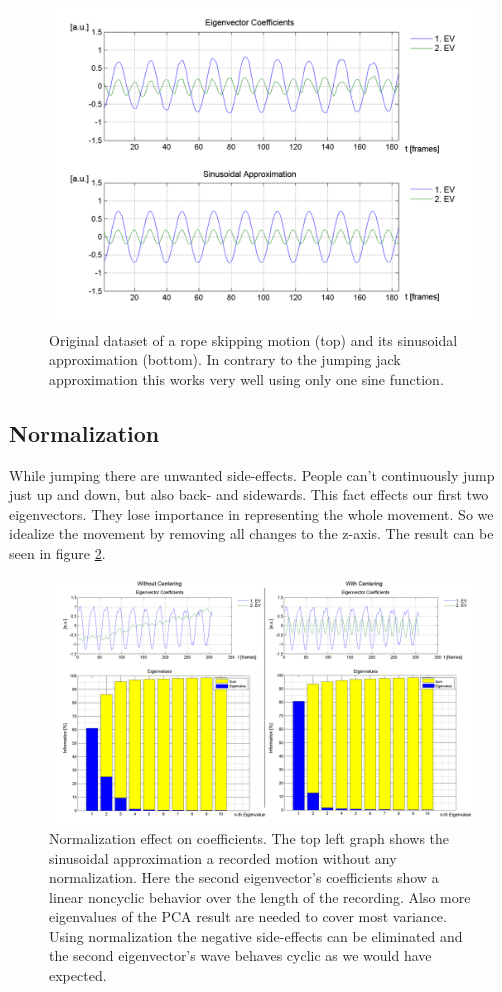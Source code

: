 \documentclass[a4paper]{article}
\begin{document}
\begin{figure}
		\centering
		\includegraphics[width=\textwidth]{1sinSeil.png}
		\caption{Original dataset of a rope skipping motion (top) and its sinusoidal approximation (bottom).
		In contrary to the jumping jack approximation this works very well using only one sine function.}
		\label{fig:approx3}
\end{figure}

\subsection{Normalization}
While jumping there are unwanted side-effects. People can't continuously jump just up and down, but also back- and sidewards. This fact effects our first two eigenvectors. They lose importance in representing the whole movement. So we idealize the movement by removing all changes to the z-axis. The result can be seen in figure \ref{fig:sammel}.

\begin{figure}
	\centering
	\includegraphics[width=15cm]{sammel.png}
	\caption{Normalization effect on coefficients. The top left graph shows the sinusoidal approximation a recorded motion without any normalization. Here the second eigenvector's coefficients show a linear noncyclic behavior over the length of the recording.
	Also more eigenvalues of the PCA result are needed to cover most variance.
	Using normalization the negative side-effects can be eliminated and the second eigenvector's wave behaves cyclic as we would have expected.}
	\label{fig:sammel}
\end{figure}
\end{document}
